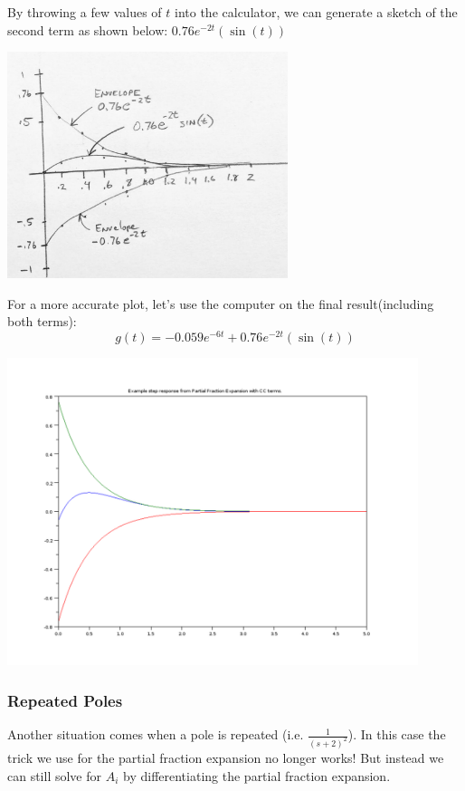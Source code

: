 \begin{ExampleCont}
By throwing a few values of $t$ into the calculator,
we can generate a sketch of the second term as shown below:
$ 0.76e^{-2t} \left (  \sin(t)  \right )$

\includegraphics[width=82mm]{figs01/J55Q14.png}

For a more accurate plot, let's use the computer on the final result(including both terms):
\[
g(t) = -0.059e^{-6t} + 0.76e^{-2t} \left (  \sin(t)  \right )
\]

\includegraphics[width=120mm]{figs01/pf_compConja.png}


\end{ExampleCont}

\subsubsection{Repeated Poles}

Another situation comes when a pole is repeated (i.e. $\frac{1}{(s+2)^2}$).  In this case the trick we use for the partial fraction expansion no longer works!   But instead we can still solve for $A_i$ by differentiating the partial fraction expansion.

